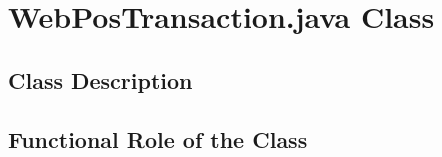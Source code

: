 \section{WebPosTransaction.java Class}
\subsection{Class Description}
\subsection{Functional Role of the Class}
